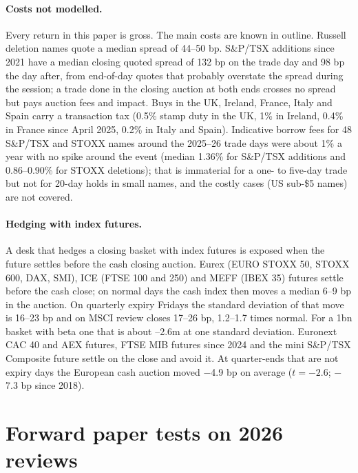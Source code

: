 \documentclass[10pt, a4paper, twocolumn]{article}
\begin{document}
\paragraph{Costs not modelled.} Every return in this paper is gross. The main costs are known in outline. Russell deletion names quote a median spread of 44--50 bp. S\&P/TSX additions since 2021 have a median closing quoted spread of 132 bp on the trade day and 98 bp the day after, from end-of-day quotes that probably overstate the spread during the session; a trade done in the closing auction at both ends crosses no spread but pays auction fees and impact. Buys in the UK, Ireland, France, Italy and Spain carry a transaction tax (0.5\% stamp duty in the UK, 1\% in Ireland, 0.4\% in France since April 2025, 0.2\% in Italy and Spain). Indicative borrow fees for 48 S\&P/TSX and STOXX names around the 2025--26 trade days were about 1\% a year with no spike around the event (median 1.36\% for S\&P/TSX additions and 0.86--0.90\% for STOXX deletions); that is immaterial for a one- to five-day trade but not for 20-day holds in small names, and the costly cases (US sub-\$5 names) are not covered.

\paragraph{Hedging with index futures.} A desk that hedges a closing basket with index futures is exposed when the future settles before the cash closing auction. Eurex (EURO STOXX 50, STOXX 600, DAX, SMI), ICE (FTSE 100 and 250) and MEFF (IBEX 35) futures settle before the cash close; on normal days the cash index then moves a median 6--9 bp in the auction. On quarterly expiry Fridays the standard deviation of that move is 16--23 bp and on MSCI review closes 17--26 bp, 1.2--1.7 times normal. For a \texteuro1bn basket with beta one that is about --2.6m at one standard deviation. Euronext CAC 40 and AEX futures, FTSE MIB futures since 2024 and the mini S\&P/TSX Composite future settle on the close and avoid it. At quarter-ends that are not expiry days the European cash auction moved $-$4.9 bp on average ($t = -2.6$; $-$7.3 bp since 2018).

\section{Forward paper tests on 2026 reviews}
\label{sec:forward}
\end{document}
